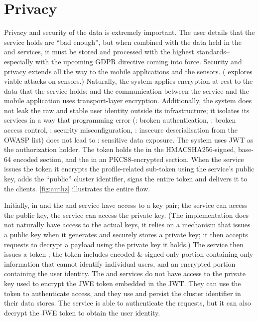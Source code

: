 \section{Privacy}
Privacy and security of the data is extremely important. The user details that the  service holds are ``bad enough'', but when combined with the data held in the  and  services, it must be stored and processed with the highest standards--especially with the upcoming GDPR\cite{gdpr} directive coming into force. Security and privacy extends all the way to the mobile applications and the sensors. (\cite{Fu:AuI932n8} explores viable attacks on sensors.) Naturally, the system applies encryption-at-rest to the data that the  service holds; and the communication between the  service and the mobile application uses transport-layer encryption. Additionally, the system does not leak the raw and stable user identity outside its infrastructure; it isolates its services in a way that programming error (: broken authentication, : broken access control, : security misconfiguration, : insecure deserialisation from the OWASP\cite{owasp} list) does not lead to : sensitive data exposure. The system uses JWT\cite{jwt} as the authorization holder. The token holds the  in the HMACSHA256-signed, base-64 encoded section, and the  in an PKCS8-encrypted section. When the  service issues the token it encrypts the profile-related sub-token using the  service's public key, adds the ``public'' cluster identifier, signs the entire token and delivers it to the clients. \autoref{fig:authz} illustrates the entire flow.


Initially, in  and  the  and  service have access to a key pair; the  service can access the public key, the  service can access the private key. (The implementation does not naturally have access to the actual keys, it relies on a mechanism that issues a public key when it generates and securely stores a private key; it then accepts requests to decrypt a payload using the private key it holds.) The  service then issues a token ; the token includes encoded \& signed-only portion containing only information that cannot identify individual users, and an encrypted portion containing the user identity. The   and   services do not have access to the private key used to encrypt the JWE token embedded in the JWT. They can use the token to authenticate access, and they use and persist the cluster identifier in their data stores. The   service is able to authenticate the requests, but it can also decrypt the JWE token to obtain the user identity.

